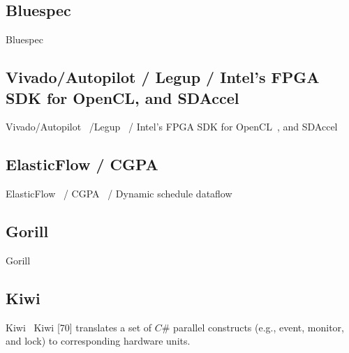 \subsection{Bluespec}
Bluespec~\cite{bluespec}
%

\subsection{Vivado/Autopilot / Legup / Intel's FPGA SDK for OpenCL, and SDAccel}

Vivado/Autopilot~\cite{vivado,vivadohls,autopilot} /Legup~\cite{canis_2011_legup} / Intel's FPGA SDK for OpenCL~\cite{opencl_sdk}, and SDAccel~\cite{sdaccel}
%

\subsection{ElasticFlow / CGPA}

ElasticFlow~\cite{elasticFlow} / CGPA~\cite{cgpa} / Dynamic schedule dataflow~\cite{josipovic_fpga_2018_dynamically}
%

\subsection{Gorill}
Gorill~\cite{lavasani_thesis}

\subsection{Kiwi}
Kiwi~\cite{kiwi}
Kiwi [70] translates a set of $C\#$ parallel constructs (e.g., event, monitor,
and lock) to corresponding hardware units.

